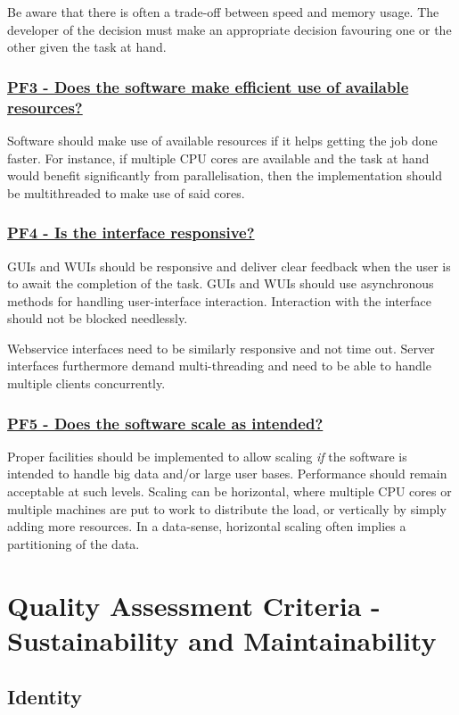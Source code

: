 \documentclass[a4paper,11pt]{article}
\newcommand{\criterion}[2]{\subsubsection*{\underline{#1 - #2}}\label{id:#1}}
\newcommand\CheckTable{%
  \begin{tabular}{ccccc}
    No & Minimal & Adequate & Good & Perfect \\
    0 & 1 & 2 & 3 & 4 \\
    \hline
    $\square$ & $\square$ & $\square$ & $\square$ & $\square$ \\
  \end{tabular}%
}
\begin{document}
Be aware that there is often a trade-off between speed and memory usage. The
developer of the decision must make an appropriate decision favouring one or the other
given the task at hand. 


\newcommand{\pfThreeID}{PF3}
\newcommand{\pfThreeText}{Does the software make efficient use of available resources?}
\criterion{\pfThreeID}{\pfThreeText}

Software should make use of available resources if it helps getting the job
done faster. For instance, if multiple CPU cores are available and the task at hand
would benefit significantly from parallelisation, then the implementation should be
multithreaded to make use of said cores.


\newcommand{\pfFourID}{PF4}
\newcommand{\pfFourText}{Is the interface responsive?}
\criterion{\pfFourID}{\pfFourText}

GUIs and WUIs should be responsive and deliver clear feedback when the user is
to await the completion of the task. GUIs and WUIs should use asynchronous methods for
handling user-interface interaction. Interaction with the interface should not
be blocked needlessly.

Webservice interfaces need to be similarly responsive and not time out. Server interfaces furthermore demand multi-threading and need to be able to handle
multiple clients concurrently.


\newcommand{\pfFiveID}{PF5}
\newcommand{\pfFiveText}{Does the software scale as intended?}
\criterion{\pfFiveID}{\pfFiveText}

Proper facilities should be implemented to allow scaling \emph{if} the software is
intended to handle big data and/or large user bases. Performance should remain
acceptable at such levels.  Scaling can be horizontal, where multiple CPU cores
or multiple machines are put to work to distribute the load, or vertically by
simply adding more resources. In a data-sense, horizontal scaling often implies
a partitioning of the data.


\section{Quality Assessment Criteria - Sustainability and Maintainability}\label{sec:sustAndMaint}

\subsection{Identity}\label{sec:ide}
\end{document}
